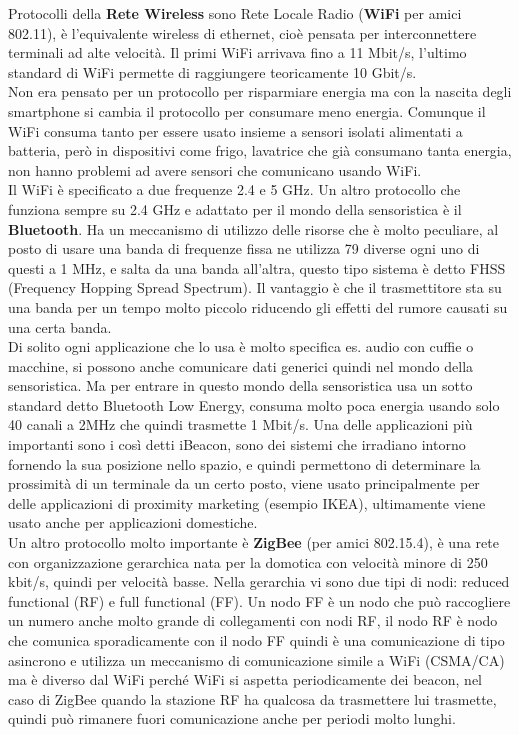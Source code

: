 \documentclass[11pt, twocolumn]{article}
\begin{document}
Protocolli della \textbf{Rete Wireless} sono Rete Locale Radio (\textbf{WiFi} per amici 802.11), è l'equivalente wireless di ethernet, cioè pensata per interconnettere terminali ad alte velocità.
Il primi WiFi arrivava fino a 11 Mbit/s, l'ultimo standard di WiFi permette di raggiungere teoricamente 10 Gbit/s.\\
Non era pensato per un protocollo per risparmiare energia ma con la nascita degli smartphone si cambia il protocollo per consumare meno energia.
Comunque il WiFi consuma tanto per essere usato insieme a sensori isolati alimentati a batteria, però in dispositivi come frigo, lavatrice che già consumano tanta energia, non hanno problemi ad avere sensori che comunicano usando WiFi.\\
Il WiFi è specificato a due frequenze 2.4 e 5 GHz.
Un altro protocollo che funziona sempre su 2.4 GHz e adattato per il mondo della sensoristica è il \textbf{Bluetooth}.
Ha un meccanismo di utilizzo delle risorse che è molto peculiare, al posto di usare una banda di frequenze fissa ne utilizza 79 diverse ogni uno di questi a 1 MHz, e salta da una banda all'altra, questo tipo sistema è detto FHSS (Frequency Hopping Spread Spectrum).
Il vantaggio è che il trasmettitore sta su una banda per un tempo molto piccolo riducendo gli effetti del rumore causati su una certa banda.\\
Di solito ogni applicazione che lo usa è molto specifica es. audio con cuffie o macchine, si possono anche comunicare dati generici quindi nel mondo della sensoristica.
Ma per entrare in questo mondo della sensoristica usa un sotto standard detto Bluetooth Low Energy, consuma molto poca energia usando solo 40 canali a 2MHz che quindi trasmette 1 Mbit/s.
Una delle applicazioni più importanti sono i così detti iBeacon, sono dei sistemi che irradiano intorno fornendo la sua posizione nello spazio, e quindi permettono di determinare la prossimità di un terminale da un certo posto, viene usato principalmente per delle applicazioni di proximity marketing (esempio IKEA), ultimamente viene usato anche per applicazioni domestiche.\\
Un altro protocollo molto importante è \textbf{ZigBee} (per amici 802.15.4), è una rete con organizzazione gerarchica nata per la domotica con velocità minore di 250 kbit/s, quindi per velocità basse.
Nella gerarchia vi sono due tipi di nodi: reduced functional (RF) e full functional (FF).
Un nodo FF è un nodo che può raccogliere un numero anche molto grande di collegamenti con nodi RF, il nodo RF è nodo che comunica sporadicamente con il nodo FF quindi è una comunicazione di tipo asincrono e utilizza un meccanismo di comunicazione simile a WiFi (CSMA/CA) ma è diverso dal WiFi perché WiFi si aspetta periodicamente dei beacon, nel caso di ZigBee quando la stazione RF ha qualcosa da trasmettere lui trasmette, quindi può rimanere fuori comunicazione anche per periodi molto lunghi.
\end{document}
